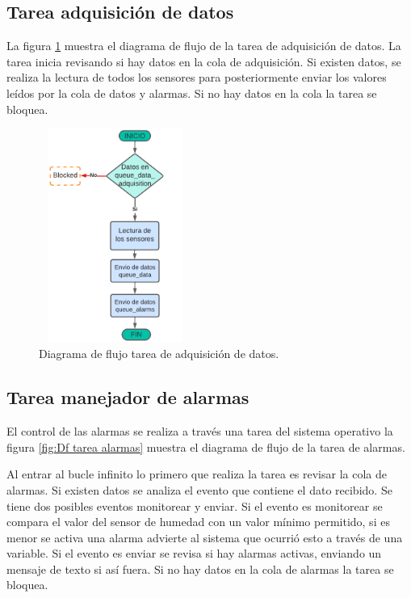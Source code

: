 \subsection{Tarea adquisición de datos} 
La figura \ref{fig:Df tarea adquisicion} muestra el diagrama de flujo de la tarea de adquisición de datos. La tarea inicia revisando si hay datos en la cola de adquisición. Si existen datos, se realiza la lectura de todos los sensores para posteriormente enviar los  valores leídos por la cola de datos y alarmas. Si no hay datos en la cola la tarea se bloquea. 

\begin{figure}[h]
  \centering
	\includegraphics[width=5cm, height=7cm]{./Figures/DF task adquisicion.png}
	\caption{Diagrama de flujo tarea de adquisición de datos.}
	\label{fig:Df tarea adquisicion}
\end{figure}

\subsection{Tarea manejador de alarmas} 
El control de las alarmas se realiza a través una tarea del sistema operativo la figura \ref{fig:Df tarea alarmas} muestra el diagrama de flujo de la tarea de alarmas.

Al entrar al bucle infinito lo primero que realiza la tarea es revisar la cola de alarmas. Si existen datos se analiza el evento que contiene el dato recibido. Se tiene dos posibles eventos monitorear y enviar. Si el evento es monitorear se compara el valor del sensor de humedad con un valor mínimo permitido, si es menor se activa una alarma advierte al sistema que ocurrió esto a través de una variable. Si el evento es enviar se revisa si hay alarmas activas, enviando un mensaje de texto si así fuera. Si no hay datos en la cola de alarmas la tarea se bloquea. 

